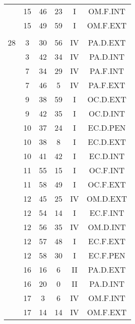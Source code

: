 \documentclass[12pt, a4paper]{article}
\begin{document}
\begin{multicols}{3}
{\begin{tabular}{c c c c c c}
	 	 	 	 & 15 & 46 & 23 & I & OM.F.INT\\%
	 	 	 	 & 15 & 49 & 59 & I & OM.F.EXT\\%
	 	 	 	 & & & & & \\%
	 	 	 	28 & 3 & 30 & 56 & IV & PA.D.EXT\\%
	 	 	 	 & 3 & 42 & 34 & IV & PA.D.INT\\%
	 	 	 	 & 7 & 34 & 29 & IV & PA.F.INT\\%
	 	 	 	 & 7 & 46 & 5 & IV & PA.F.EXT\\%
	 	 	 	 & 9 & 38 & 59 & I & OC.D.EXT\\%
	 	 	 	 & 9 & 42 & 35 & I & OC.D.INT\\%
	 	 	 	 & 10 & 37 & 24 & I & EC.D.PEN\\%
	 	 	 	 & 10 & 38 & 8 & I & EC.D.EXT\\%
	 	 	 	 & 10 & 41 & 42 & I & EC.D.INT\\%
	 	 	 	 & 11 & 55 & 15 & I & OC.F.INT\\%
	 	 	 	 & 11 & 58 & 49 & I & OC.F.EXT\\%
	 	 	 	 & 12 & 45 & 25 & IV & OM.D.EXT\\%
	 	 	 	 & 12 & 54 & 14 & I & EC.F.INT\\%
	 	 	 	 & 12 & 56 & 35 & IV & OM.D.INT\\%
	 	 	 	 & 12 & 57 & 48 & I & EC.F.EXT\\%
	 	 	 	 & 12 & 58 & 30 & I & EC.F.PEN\\%
	 	 	 	 & 16 & 16 & 6 & II & PA.D.EXT\\%
	 	 	 	 & 16 & 20 & 0 & II & PA.D.INT\\%
	 	 	 	 & 17 & 3 & 6 & IV & OM.F.INT\\%
	 	 	 	 & 17 & 14 & 14 & IV & OM.F.EXT\\%

\end{tabular}}
\end{multicols}
\end{document}
